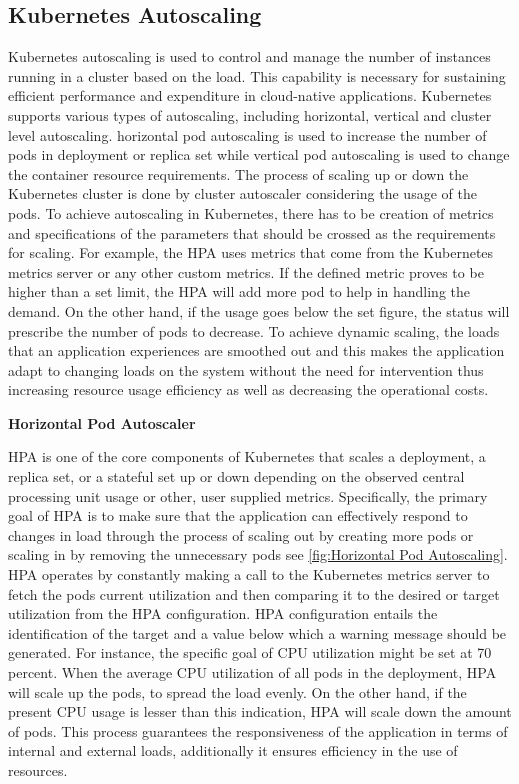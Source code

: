 \subsection{Kubernetes Autoscaling}

Kubernetes autoscaling is used to control and manage the number of instances running in a cluster based on the load. This capability is necessary for sustaining efficient performance and expenditure in cloud-native applications. Kubernetes supports various types of autoscaling, including horizontal, vertical and cluster level autoscaling. horizontal pod autoscaling  is used to increase the number of pods in deployment or replica set while vertical pod autoscaling  is used to change the container resource requirements. The process of scaling up or down the Kubernetes cluster is done by cluster autoscaler considering the usage of the pods. To achieve autoscaling in Kubernetes, there has to be creation of metrics and specifications of the parameters that should be crossed as the requirements for scaling. For example, the HPA uses metrics that come from the Kubernetes metrics server or any other custom metrics. If the defined metric proves to be higher than a set limit, the HPA will add more pod to help in handling the demand. On the other hand, if the usage goes below the set figure, the status will prescribe the number of pods to decrease. To achieve dynamic scaling, the loads that an application experiences are smoothed out and this makes the application adapt to changing loads on the system without the need for intervention thus increasing resource usage efficiency as well as decreasing the operational costs. \cite{Kubernetes_doc}


\textbf{Horizontal Pod Autoscaler}

HPA is one of the core components of Kubernetes that scales a deployment, a replica set, or a stateful set up or down depending on the observed central processing unit  usage or other, user supplied metrics. Specifically, the primary goal of HPA is to make sure that the application can effectively respond to changes in load through the process of scaling out by creating more pods or scaling in by removing the unnecessary pods see \autoref{fig:Horizontal Pod Autoscaling}. HPA operates by constantly making a call to the Kubernetes metrics server to fetch the pods current utilization and then comparing it to the desired or target utilization from the HPA configuration. HPA configuration entails the identification of the target and a value below which a warning message should be generated. For instance, the specific goal of CPU utilization might be set at 70 percent. When the average CPU utilization of all pods in the deployment, HPA will scale up the pods, to spread the load evenly. On the other hand, if the present CPU usage is lesser than this indication, HPA will scale down the amount of pods. This process guarantees the responsiveness of the application in terms of internal and external loads, additionally it ensures efficiency in the use of resources. \cite{Kubernetes_doc}


